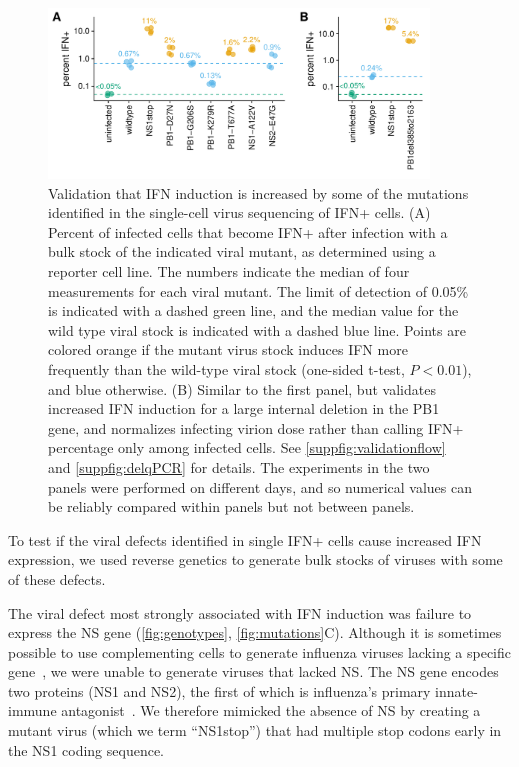 \documentclass[lineno]{asm-article}
\newcommand{\FIG}[1]{\autoref{fig:#1}}
\newcommand{\SUPPFIG}[1]{\autoref{suppfig:#1}}
\begin{document}
\begin{figure}

\centerline{\includegraphics[width=0.9\textwidth]{figures/Validation_Figure/ifn_plot.pdf}}
\caption{
Validation that IFN induction is increased by some of the mutations identified in the single-cell virus sequencing of IFN+ cells.
(A)
Percent of infected cells that become IFN+ after infection with a bulk stock of the indicated viral mutant, as determined using a reporter cell line.
The numbers indicate the median of four measurements for each viral mutant.
The limit of detection of 0.05\% is indicated with a dashed green line, and the median value for the wild type viral stock is indicated with a dashed blue line.
Points are colored orange if the mutant virus stock induces IFN more frequently than the wild-type viral stock (one-sided t-test, $P < 0.01$), and blue otherwise.
(B)
Similar to the first panel, but validates increased IFN induction for a large internal deletion in the PB1 gene, and normalizes infecting virion dose rather than calling IFN+ percentage only among infected cells.
See \SUPPFIG{validationflow} and \SUPPFIG{delqPCR} for details.
The experiments in the two panels were performed on different days, and so numerical values can be reliably compared within panels but not between panels.
}
\label{fig:validation}

\end{figure}

To test if the viral defects identified in single IFN+ cells cause increased IFN expression, we used reverse genetics to generate bulk stocks of viruses with some of these defects.

The viral defect most strongly associated with IFN induction was failure to express the NS gene (\FIG{genotypes}, \FIG{mutations}C).
Although it is sometimes possible to use complementing cells to generate influenza viruses lacking a specific gene~\cite{fujii2003selective,marsh2007specific}, we were unable to generate viruses that lacked NS.
The NS gene encodes two proteins (NS1 and NS2), the first of which is influenza's primary innate-immune antagonist~\cite{garcia1998influenza, hale2008multifunctional}.
We therefore mimicked the absence of NS by creating a mutant virus (which we term ``NS1stop'') that had multiple stop codons early in the NS1 coding sequence.
\end{document}
